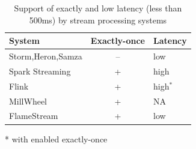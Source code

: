 \begin{table}[htbp]
\begin{threeparttable}
\begin{tabular}{lcl}
System             & Exactly-once & Latency    \\
\hline
Storm,Heron,Samza  &    --         &   low            \\
Spark Streaming    &    +          &   high           \\
Flink              &    +          &   high$^*$       \\
MillWheel          &    +          &   NA             \\
FlameStream        &    +          &   low            \\
\end{tabular}
* with enabled exactly-once~\cite{we2018beyondmr}
\end{threeparttable}
\caption{Support of exactly and low latency (less than 500ms) by stream processing systems}
\label{comparison}
\vspace{-6mm}
\end{table}